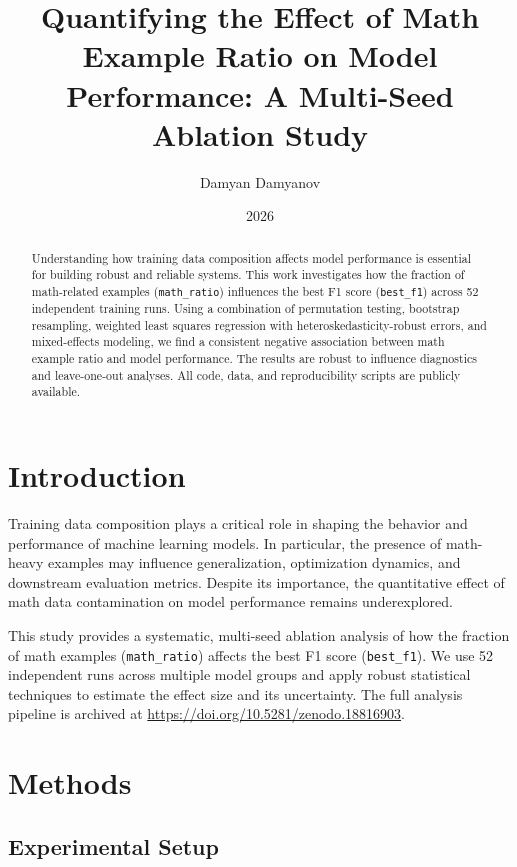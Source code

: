\documentclass[11pt]{article}
\title{Quantifying the Effect of Math Example Ratio on Model Performance: A Multi-Seed Ablation Study}
\author{Damyan Damyanov}
\date{2026}
\begin{document}
\maketitle

\begin{abstract}
Understanding how training data composition affects model performance is essential for building robust and reliable systems. This work investigates how the fraction of math-related examples (\texttt{math\_ratio}) influences the best F1 score (\texttt{best\_f1}) across 52 independent training runs. Using a combination of permutation testing, bootstrap resampling, weighted least squares regression with heteroskedasticity-robust errors, and mixed-effects modeling, we find a consistent negative association between math example ratio and model performance. The results are robust to influence diagnostics and leave-one-out analyses. All code, data, and reproducibility scripts are publicly available.
\end{abstract}

\section{Introduction}

Training data composition plays a critical role in shaping the behavior and performance of machine learning models. In particular, the presence of math-heavy examples may influence generalization, optimization dynamics, and downstream evaluation metrics. Despite its importance, the quantitative effect of math data contamination on model performance remains underexplored.

This study provides a systematic, multi-seed ablation analysis of how the fraction of math examples (\texttt{math\_ratio}) affects the best F1 score (\texttt{best\_f1}). We use 52 independent runs across multiple model groups and apply robust statistical techniques to estimate the effect size and its uncertainty. The full analysis pipeline is archived at \url{https://doi.org/10.5281/zenodo.18816903}.

\section{Methods}

\subsection{Experimental Setup}
\end{document}
